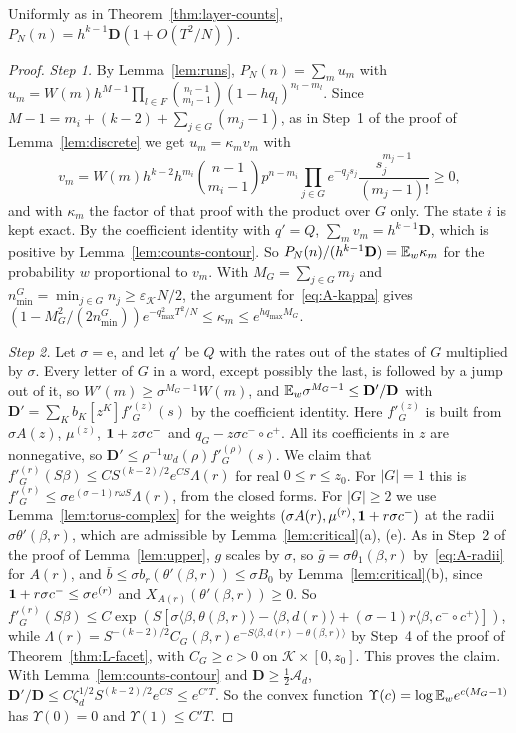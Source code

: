 \begin{lemma}\label{lem:counts-half}
Uniformly as in Theorem~\ref{thm:layer-counts}, $P_N(n)=h^{k-1}\mathbf D(1+O(T^2/N))$.
\end{lemma}

\begin{proof}
\emph{Step 1.} By Lemma~\ref{lem:runs}, $P_N(n)=\sum_mu_m$ with
$u_m=W(m)h^{M-1}\prod_{l\in F}\binom{n_l-1}{m_l-1}(1-hq_l)^{n_l-m_l}$. Since
$M-1=m_i+(k-2)+\sum_{j\in G}(m_j-1)$, as in Step~1 of the proof of Lemma~\ref{lem:discrete} we get
$u_m=\kappa_mv_m$ with
\[
v_m=W(m)h^{k-2}h^{m_i}\binom{n-1}{m_i-1}p^{n-m_i}\prod_{j\in G}e^{-q_js_j}\frac{s_j^{m_j-1}}{(m_j-1)!}\ge0,
\]
and with $\kappa_m$ the factor of that proof with the product over $G$ only. The state $i$ is kept
exact. By the coefficient identity with $q'=Q$, $\sum_mv_m=h^{k-1}\mathbf D$, which is positive by
Lemma~\ref{lem:counts-contour}. So $P_N(n)/(h^{k-1}\mathbf D)=\mathbb{E}_w\kappa_m$ for the probability $w$
proportional to $v_m$. With $M_G=\sum_{j\in G}m_j$ and $n^G_{\min}=\min_{j\in G}n_j\ge\varepsilon_{\mathcal K}N/2$,
the argument for~\eqref{eq:A-kappa} gives
$(1-M_G^2/(2n^G_{\min}))e^{-q_{\max}^2T^2/N}\le\kappa_m\le e^{hq_{\max}M_G}$.

\emph{Step 2.} Let $\sigma=\mathrm e$, and let $q'$ be $Q$ with the rates out of the states of $G$
multiplied by $\sigma$. Every letter of $G$ in a word, except possibly the last, is followed by
a jump out of it, so $W'(m)\ge\sigma^{M_G-1}W(m)$, and $\mathbb{E}_w\sigma^{M_G-1}\le\mathbf D'/\mathbf D$
with $\mathbf D'=\sum_Kb_K[z^K]f'^{(z)}_G(s)$ by the coefficient identity. Here $f'^{(z)}_G$ is built
from $\sigma A(z)$, $\mu^{(z)}$, $\mathbf{1}+z\sigma c^-$ and $q_G-z\sigma c^-\circ c^+$. All its coefficients
in $z$ are nonnegative, so $\mathbf D'\le\rho^{-1}w_d(\rho)f'^{(\rho)}_G(s)$. We claim that
$f'^{(r)}_G(S\beta)\le CS^{(k-2)/2}e^{CS}\Lambda(r)$ for real $0\le r\le z_0$. For $|G|=1$ this is
$f'^{(r)}_G\le\sigma e^{(\sigma-1)r\omega S}\Lambda(r)$, from the closed forms. For $|G|\ge2$ we use
Lemma~\ref{lem:torus-complex} for the weights $(\sigma A(r),\mu^{(r)},\mathbf{1}+r\sigma c^-)$ at the
radii $\sigma\theta'(\beta,r)$, which are admissible by Lemma~\ref{lem:critical}(a), (e). As in
Step~2 of the proof of Lemma~\ref{lem:upper}, $g$ scales by $\sigma$, so $\bar g=\sigma\theta_1(\beta,r)$
by~\eqref{eq:A-radii} for $A(r)$, and $\bar b\le\sigma b_r(\theta'(\beta,r))\le\sigma B_0$ by
Lemma~\ref{lem:critical}(b), since $\mathbf{1}+r\sigma c^-\le\sigma e^{(r)}$ and $X_{A(r)}(\theta'(\beta,r))\ge0$.
So $f'^{(r)}_G(S\beta)\le C\exp(S[\sigma\langle\beta,\theta(\beta,r)\rangle-\langle\beta,d(r)\rangle+(\sigma-1)r\langle\beta,c^-\circ c^+\rangle])$,
while $\Lambda(r)=S^{-(k-2)/2}C_G(\beta,r)e^{-S\langle\beta,d(r)-\theta(\beta,r)\rangle}$ by Step~4 of the
proof of Theorem~\ref{thm:L-facet}, with $C_G\ge c>0$ on $\mathcal K\times[0,z_0]$. This proves the
claim. With Lemma~\ref{lem:counts-contour} and $\mathbf D\ge\frac12\mathcal A_d$,
$\mathbf D'/\mathbf D\le C\zeta_d^{1/2}S^{(k-2)/2}e^{CS}\le e^{C'T}$. So the convex function
$\Upsilon(c)=\log\mathbb{E}_we^{c(M_G-1)}$ has $\Upsilon(0)=0$ and $\Upsilon(1)\le C'T$.


\end{proof}
